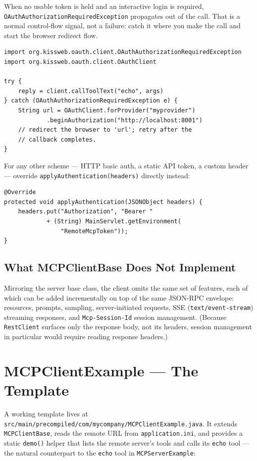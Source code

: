 When no usable token is held and an interactive login is required, \texttt{OAuthAuthorizationRequiredException} propagates out of the call.  That is a normal control-flow signal, not a failure: catch it where you make the call and start the browser redirect flow.

\begin{lstlisting}[style=groovy,basicstyle=\ttfamily\scriptsize]
import org.kissweb.oauth.client.OAuthAuthorizationRequiredException
import org.kissweb.oauth.client.OAuthClient

try {
    reply = client.callToolText("echo", args)
} catch (OAuthAuthorizationRequiredException e) {
    String url = OAuthClient.forProvider("myprovider")
            .beginAuthorization("http://localhost:8001")
    // redirect the browser to 'url'; retry after the
    // callback completes.
}
\end{lstlisting}

\noindent
For any other scheme --- HTTP basic auth, a static API token, a custom header --- override \texttt{applyAuthentication(headers)} directly instead:

\begin{lstlisting}[style=java]
@Override
protected void applyAuthentication(JSONObject headers) {
    headers.put("Authorization", "Bearer "
            + (String) MainServlet.getEnvironment(
                "RemoteMcpToken"));
}
\end{lstlisting}

\subsection{What MCPClientBase Does Not Implement}

Mirroring the server base class, the client omits the same set of features, each of which can be added incrementally on top of the same JSON-RPC envelope: resources, prompts, sampling, server-initiated requests, SSE (\texttt{text/event-stream}) streaming responses, and \texttt{Mcp-Session-Id} session management.  (Because \texttt{RestClient} surfaces only the response body, not its headers, session management in particular would require reading response headers.)

\section{MCPClientExample --- The Template}
\label{sec:ext-mcpclientexample}

A working template lives at \texttt{src/main/precom\-piled/com/mycompany/MCPClient\-Example.java}.  It extends \texttt{MCPClientBase}, reads the remote URL from \texttt{application.ini}, and provides a static \texttt{demo()} helper that lists the remote server's tools and calls its \texttt{echo} tool --- the natural counterpart to the \texttt{echo} tool in \texttt{MCPServerExample}:

